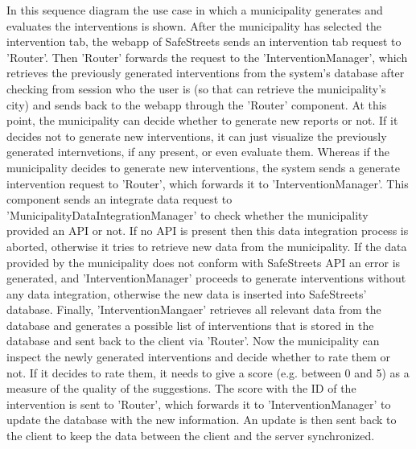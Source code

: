 In this sequence diagram the use case in which a municipality generates and evaluates the interventions is shown. After the municipality has selected the intervention tab, the webapp of SafeStreets sends an intervention tab request to 'Router'. Then 'Router' forwards the request to the 'InterventionManager', which retrieves the previously generated interventions from the system's database after checking from session who the user is (so that can retrieve the municipality's city) and sends back to the webapp through the 'Router' component. At this point, the municipality can decide whether to generate new reports or not. If it decides not to generate new interventions, it can just visualize the previously generated internvetions, if any present, or even evaluate them. Whereas if the municipality decides to generate new interventions, the system sends a generate intervention request to 'Router', which forwards it to 'InterventionManager'. This component sends an integrate data request to 'MunicipalityDataIntegrationManager' to check whether the municipality provided an API or not. If no API is present then this data integration process is aborted, otherwise it tries to retrieve new data from the municipality. If the data provided by the municipality does not conform with SafeStreets API an error is generated, and 'InterventionManager' proceeds to generate interventions without any data integration, otherwise the new data is inserted into SafeStreets' database. Finally, 'InterventionMangaer' retrieves all relevant data from the database and generates a possible list of interventions that is stored in the database and sent back to the client via 'Router'. Now the municipality can inspect the newly generated interventions and decide whether to rate them or not. If it decides to rate them, it needs to give a score (e.g. between 0 and 5) as a measure of the quality of the suggestions. The score with the ID of the intervention is sent to 'Router', which forwards it to 'InterventionManager' to update the database with the new information. An update is then sent back to the client to keep the data between the client and the server synchronized.	